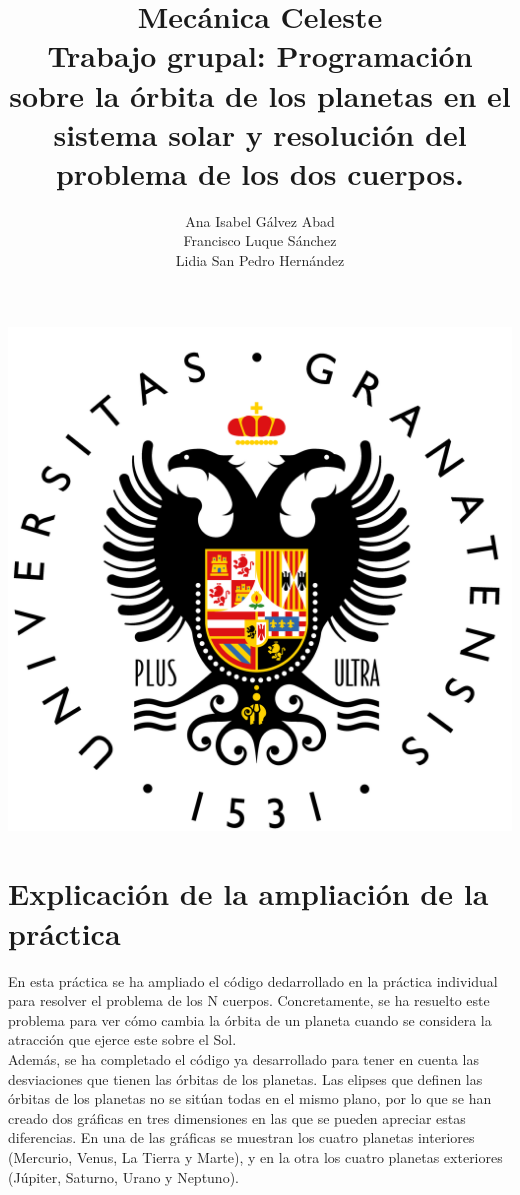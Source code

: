 \documentclass[12pt]{article}
\title{
  Mecánica Celeste\\
  \large Trabajo grupal: Programación sobre la 
  órbita de los planetas en el sistema solar y
  resolución del problema de los dos cuerpos.  }
\author{ 
  Ana Isabel Gálvez Abad\\
  Francisco Luque Sánchez\\
  Lidia San Pedro Hernández
}
\begin{document}
\maketitle
\begin{center}  
\includegraphics[scale=0.35]{escudo.png}
\end{center}

\newpage

\section{Explicación de la ampliación de la práctica}

En esta práctica se ha ampliado el código dedarrollado en la práctica
individual para resolver el problema de los N cuerpos. Concretamente,
se ha resuelto este problema para ver cómo cambia la órbita de un
planeta cuando se considera la atracción que ejerce este sobre el Sol.\\

Además, se ha completado el código ya desarrollado para tener en cuenta
las desviaciones que tienen las órbitas de los planetas. Las elipses que
definen las órbitas de los planetas no se sitúan todas en el mismo plano,
por lo que se han creado dos gráficas en tres dimensiones en las que se
pueden apreciar estas diferencias. En una de las gráficas se muestran
los cuatro planetas interiores (Mercurio, Venus, La Tierra y Marte),
y en la otra los cuatro planetas exteriores (Júpiter, Saturno, Urano
y Neptuno).
\end{document}
